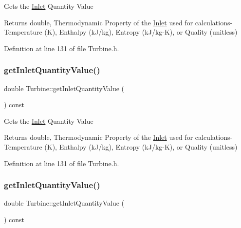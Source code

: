 Gets the \hyperlink{class_inlet}{Inlet} Quantity Value

\begin{DoxyReturn}{Returns}
double, Thermodynamic Property of the \hyperlink{class_inlet}{Inlet} used for calculations-\/ Temperature (K), Enthalpy (k\+J/kg), Entropy (k\+J/kg-\/K), or Quality (unitless) 
\end{DoxyReturn}


Definition at line 131 of file Turbine.\+h.

\mbox{\label{class_turbine_a3d8a3f317fa71abb3404144371615725}} 
\subsubsection{\texorpdfstring{get\+Inlet\+Quantity\+Value()}{getInletQuantityValue()}\hspace{0.1cm}{\footnotesize\ttfamily [2/3]}}
{\footnotesize\ttfamily double Turbine\+::get\+Inlet\+Quantity\+Value (\begin{DoxyParamCaption}{ }\end{DoxyParamCaption}) const\hspace{0.3cm}{\ttfamily [inline]}}

Gets the \hyperlink{class_inlet}{Inlet} Quantity Value

\begin{DoxyReturn}{Returns}
double, Thermodynamic Property of the \hyperlink{class_inlet}{Inlet} used for calculations-\/ Temperature (K), Enthalpy (k\+J/kg), Entropy (k\+J/kg-\/K), or Quality (unitless) 
\end{DoxyReturn}


Definition at line 131 of file Turbine.\+h.

\mbox{\label{class_turbine_a3d8a3f317fa71abb3404144371615725}} 
\subsubsection{\texorpdfstring{get\+Inlet\+Quantity\+Value()}{getInletQuantityValue()}\hspace{0.1cm}{\footnotesize\ttfamily [3/3]}}
{\footnotesize\ttfamily double Turbine\+::get\+Inlet\+Quantity\+Value (\begin{DoxyParamCaption}{ }\end{DoxyParamCaption}) const\hspace{0.3cm}{\ttfamily [inline]}}

